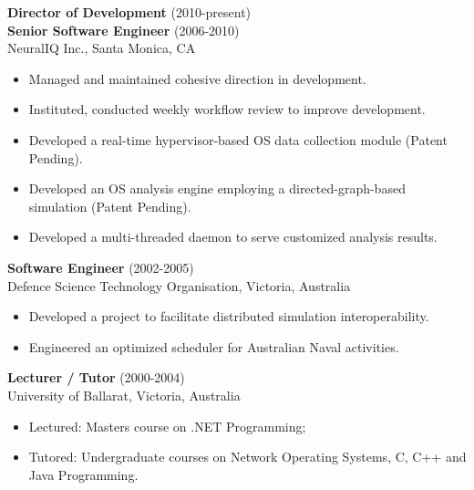 \begin{resume}
{\bf Director of Development} (2010-present) \\
{\bf Senior Software Engineer} (2006-2010) \\
NeuralIQ Inc., Santa Monica, CA \\
\begin{itemize}
  \item Managed and maintained cohesive direction in development.
  \item Instituted, conducted weekly workflow review to improve development.
  \item Developed a real-time hypervisor-based OS data collection module (Patent Pending).
  \item Developed an OS analysis engine employing a directed-graph-based simulation (Patent Pending).
  \item Developed a multi-threaded daemon to serve customized analysis results.
\end{itemize}


{\bf Software Engineer} (2002-2005) \\
Defence Science Technology Organisation, Victoria, Australia \\
\begin{itemize}
  \item Developed a project to facilitate distributed simulation interoperability.
  \item Engineered an optimized scheduler for Australian Naval activities.
\end{itemize}

{\bf Lecturer / Tutor} (2000-2004) \\
University of Ballarat, Victoria, Australia \\
\begin{itemize}
  \item Lectured: Masters course on .NET Programming; 
  \item Tutored: Undergraduate courses on Network Operating Systems, C, C++ and Java Programming.
\end{itemize}


\end{resume}
